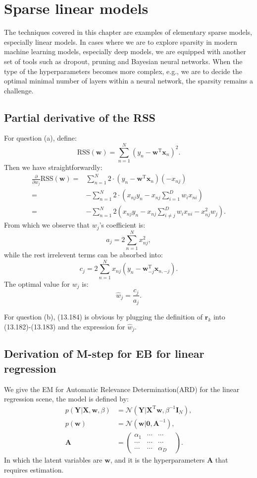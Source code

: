 \documentclass[UTF8]{ctexart}
\begin{document}
\newpage
\section{Sparse linear models}
The techniques covered in this chapter are examples of elementary sparse models, especially linear models.
In cases where we are to explore sparsity in modern machine learning models, especially deep models, we are equipped with another set of tools such as dropout, pruning and Bayesian neural networks.
When the type of the hyperparameters becomes more complex, e.g., we are to decide the optimal minimal number of layers within a neural network, the sparsity remains a challenge.

\subsection{Partial derivative of the RSS}
For question (a), define:
$$\text{RSS}(\textbf{w})=\sum_{n=1}^{N}(y_{n}-\textbf{w}^{\text{T}}\textbf{x}_{n})^{2}.$$
Then we have straightforwardly:
\begin{align}
\frac{\partial}{\partial w_{j}}\text{RSS}(\textbf{w})=&\sum_{n=1}^{N}2\cdot(y_{n}-\textbf{w}^{\text{T}}\textbf{x}_{n})(-x_{nj})\nonumber \\
=&-\sum_{n=1}^{N}2\cdot(x_{nj}y_{n}-x_{nj}\sum_{i=1}^{D}w_{i}x_{ni})\nonumber \\
=&-\sum_{n=1}^{N}2(x_{nj}y_{n}-x_{nj}\sum_{i\neq j}^{D}w_{i}x_{ni}-x_{nj}^{2}w_{j}).\nonumber
\end{align}
From which we observe that $w_{j}$'s coefficient is:
$$a_{j}=2\sum_{n=1}^{N}x_{nj}^{2},$$
while the rest irrelevent terms can be absorbed into:
$$c_{j}=2\sum_{n=1}^{N}x_{nj}(y_{n}-\textbf{w}_{-j}^{\text{T}}\textbf{x}_{n,-j}).$$
The optimal value for $w_{j}$ is:
$$\hat{w}_{j}=\frac{c_{j}}{a_{j}}.$$

For question (b), (13.184) is obvious by plugging the definition of $\textbf{r}_{k}$ into (13.182)-(13.183) and the expression for $\hat{w}_{j}$.


\subsection{Derivation of M-step for EB for linear regression}
We give the EM for Automatic Relevance Determination(ARD) for the linear regression scene, the model is defined by:
$$
\begin{aligned}
p(\textbf{Y}|\textbf{X},\textbf{w},\beta)&=\mathcal{N}(\textbf{Y}|\textbf{X}^{\text{T}}\textbf{w},\beta^{-1}\textbf{I}_{N}),\\
p(\textbf{w})&=\mathcal{N}(\textbf{w}|\textbf{0},\textbf{A}^{-1}),\\
\textbf{A}&=
\begin{pmatrix}
\alpha_{1} & \cdots & \cdots \\
\cdots & \cdots& \cdots&\\
\cdots & \cdots & \alpha_{D}
\end{pmatrix}.
\end{aligned}
$$
In which the latent variables are $\textbf{w}$, and it is the hyperparameters $\textbf{A}$ that requires estimation.
\end{document}
